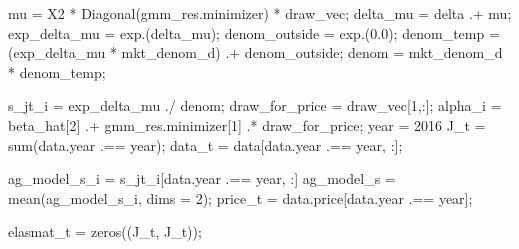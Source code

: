 \documentclass[
  letterpaper,
  DIV=11,
  numbers=noendperiod]{scrreprt}
\newenvironment{Shaded}{\begin{snugshade}}{\end{snugshade}}
\newcommand{\CharTok}[1]{\textcolor[rgb]{0.13,0.47,0.30}{#1}}
\newcommand{\FloatTok}[1]{\textcolor[rgb]{0.68,0.00,0.00}{#1}}
\newcommand{\FunctionTok}[1]{\textcolor[rgb]{0.28,0.35,0.67}{#1}}
\newcommand{\NormalTok}[1]{\textcolor[rgb]{0.00,0.23,0.31}{#1}}
\newcommand{\OperatorTok}[1]{\textcolor[rgb]{0.37,0.37,0.37}{#1}}
\begin{document}
\begin{Shaded}
\begin{Highlighting}[]
\NormalTok{mu }\OperatorTok{=}\NormalTok{ X2 }\OperatorTok{*} \FunctionTok{Diagonal}\NormalTok{(gmm\_res.minimizer) }\OperatorTok{*}\NormalTok{ draw\_vec;}
\NormalTok{delta\_mu }\OperatorTok{=}\NormalTok{ delta }\OperatorTok{.+}\NormalTok{ mu;}
\NormalTok{exp\_delta\_mu }\OperatorTok{=} \FunctionTok{exp}\NormalTok{.(delta\_mu);}
\NormalTok{denom\_outside }\OperatorTok{=} \FunctionTok{exp}\NormalTok{.(}\FloatTok{0.0}\NormalTok{);}
\NormalTok{denom\_temp }\OperatorTok{=}\NormalTok{ (exp\_delta\_mu}\OperatorTok{\textquotesingle{}} \OperatorTok{*}\NormalTok{ mkt\_denom\_d)}\CharTok{\textquotesingle{} .+ denom\_outside;}
\NormalTok{denom }\OperatorTok{=}\NormalTok{ mkt\_denom\_d }\OperatorTok{*}\NormalTok{ denom\_temp;}

\NormalTok{s\_jt\_i }\OperatorTok{=}\NormalTok{ exp\_delta\_mu }\OperatorTok{./}\NormalTok{ denom;}
\NormalTok{draw\_for\_price }\OperatorTok{=}\NormalTok{ draw\_vec[}\FloatTok{1}\NormalTok{,}\OperatorTok{:}\NormalTok{];}
\NormalTok{alpha\_i }\OperatorTok{=}\NormalTok{ beta\_hat[}\FloatTok{2}\NormalTok{] }\OperatorTok{.+}\NormalTok{ gmm\_res.minimizer[}\FloatTok{1}\NormalTok{] }\OperatorTok{.*}\NormalTok{ draw\_for\_price;}
\NormalTok{year }\OperatorTok{=} \FloatTok{2016}
\NormalTok{J\_t }\OperatorTok{=} \FunctionTok{sum}\NormalTok{(data.year }\OperatorTok{.==}\NormalTok{ year);}
\NormalTok{data\_t }\OperatorTok{=}\NormalTok{ data[data.year }\OperatorTok{.==}\NormalTok{ year, }\OperatorTok{:}\NormalTok{];}

\NormalTok{ag\_model\_s\_i }\OperatorTok{=}\NormalTok{ s\_jt\_i[data.year }\OperatorTok{.==}\NormalTok{ year, }\OperatorTok{:}\NormalTok{]}
\NormalTok{ag\_model\_s }\OperatorTok{=} \FunctionTok{mean}\NormalTok{(ag\_model\_s\_i, dims }\OperatorTok{=} \FloatTok{2}\NormalTok{);}
\NormalTok{price\_t }\OperatorTok{=}\NormalTok{ data.price[data.year }\OperatorTok{.==}\NormalTok{ year];}

\NormalTok{elasmat\_t }\OperatorTok{=} \FunctionTok{zeros}\NormalTok{((J\_t, J\_t));}


\end{Highlighting}
\end{Shaded}
\end{document}
